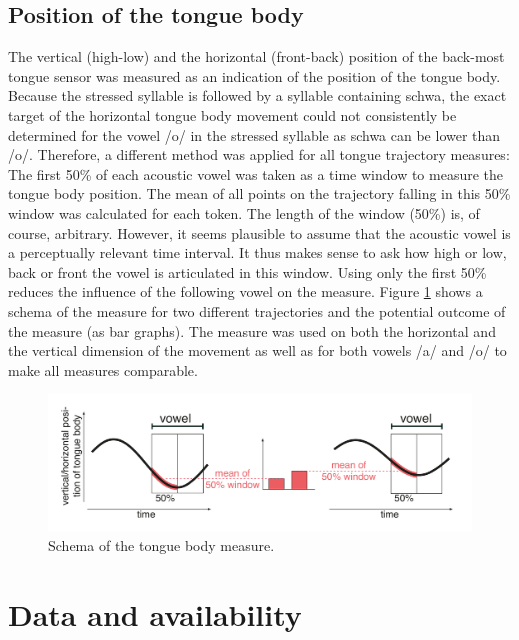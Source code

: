 \subsection{Position of the tongue body}

The vertical (high-low) and the horizontal (front-back) position of the back-most tongue sensor was measured as an indication of the position of the tongue body. Because the stressed syllable is followed by a syllable containing schwa, the exact target of the horizontal tongue body movement could not consistently be determined for the vowel /o/ in the stressed syllable as schwa can be lower than /o/. Therefore, a different method was applied for all tongue trajectory measures: The first 50\% of each acoustic vowel was taken as a time window to measure the tongue body position. The mean of all points on the trajectory falling in this 50\% window was calculated for each token. The length of the window (50\%) is, of course, arbitrary. However, it seems plausible to assume that the acoustic vowel is a perceptually relevant time interval. It thus makes sense to ask how high or low, back or front the vowel is articulated in this window. Using only the first 50\% reduces the influence of the following vowel on the measure. Figure \ref{fig:tounge_measure} shows a schema of the measure for two different trajectories and the potential outcome of the measure (as bar graphs). The measure was used on both the horizontal and the vertical dimension of the movement as well as for both vowels /a/ and /o/ to make all measures comparable.

\begin{figure}[htbp]
\begin{center}
\includegraphics[width=\textwidth]{figures/ch5/measures_tbo2.pdf}
\caption{Schema of the tongue body measure.}
\label{fig:tounge_measure}
\end{center}
\end{figure}

\section{Data and availability}


